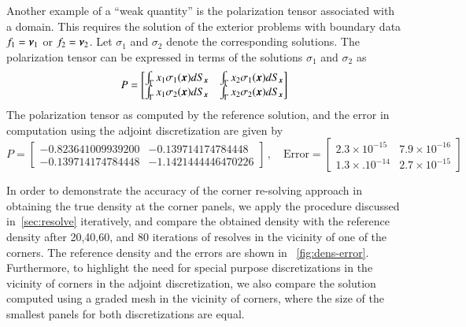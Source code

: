 Another example of a ``weak quantity'' is the polarization tensor associated with a domain. This requires the solution of the
exterior problems with boundary data $f_{1} = \boldsymbol{\nu}_{1}$ or $f_{2} = \boldsymbol{\nu}_{2}$. Let $\sigma_{1}$ and $\sigma_{2}$ denote
the corresponding solutions. The polarization tensor can be expressed in terms of the solutions $\sigma_{1}$ and $\sigma_{2}$
as
\begin{equation}
P = \begin{bmatrix}
\int_{\Gamma} x_{1} \sigma_{1}(\boldsymbol{x}) dS_{\boldsymbol{x}} & \int_{\Gamma} x_{2} \sigma_{1}(\boldsymbol{x}) dS_{\boldsymbol{x}} \\
\int_{\Gamma} x_{1} \sigma_{2}(\boldsymbol{x}) dS_{\boldsymbol{x}} & \int_{\Gamma} x_{2} \sigma_{2}(\boldsymbol{x}) dS_{\boldsymbol{x}} 
\end{bmatrix}
\end{equation}
The polarization tensor as computed by the reference solution, and the error in computation using the adjoint discretization
are given by
\begin{equation}
P = \begin{bmatrix}
-0.823641009939200 & -0.139714174784448 \\
 -0.139714174784448 &  -1.1421444446470226
\end{bmatrix} \, , \quad \text{Error} = 
\begin{bmatrix} 
2.3 \times 10^{-15} & 7.9 \times 10^{-16} \\
1.3 \times. 10^{-14} & 2.7 \times 10^{-15}
\end{bmatrix}
\end{equation}

In order to demonstrate the accuracy of the corner re-solving approach in obtaining the true density at the corner panels, we  apply the procedure
discussed in~\cref{sec:resolve} iteratively, and compare the obtained density with the reference density after 20,40,60, and
80 iterations of resolves in the vicinity of one of the corners. The reference density and the errors are shown in ~\cref{fig:dens-error}. Furthermore, to highlight the need for special purpose discretizations in the vicinity of corners in the adjoint discretization, we also compare the solution computed using a graded mesh in the vicinity of corners, where the size of the smallest panels for both discretizations are equal. 

